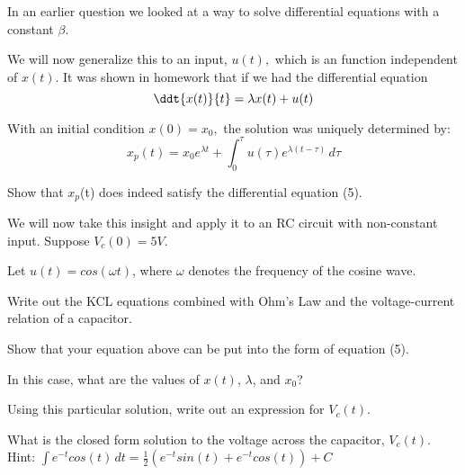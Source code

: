 
In an earlier question we looked at a way to solve differential equations with a constant $\beta.$
\par

We will now generalize this to an input, $u(t),$ which is an function independent of $x(t)$.
It was shown in homework that if we had the differential equation
\begin{equation}
\ddt{x(t)}{t} = \lambda x(t) + u(t)
\end{equation}

With an initial condition $x(0) = x_0,$ the solution was uniquely determined by:
\begin{equation}
    x_{p}(t) = x_{0}e^{\lambda{}t} + \int_0^\tau{} \! u(\tau{})e^{\lambda{}(t - \tau{})} \, d\tau{}
\end{equation}

\begin{enumerate}

\qitem Show that $x_{p}$(t) does indeed satisfy the differential equation (5).

\end{enumerate}

We will now take this insight and apply it to an RC circuit with non-constant input. Suppose $V_{c}(0) = 5V$.

\begin{figure}[H]
 
\end{figure}
Let $u(t) = cos(\omega{}t)$, where $\omega{}$ denotes the frequency of the cosine wave.

\begin{enumerate}[resume]

\qitem Write out the KCL equations combined with Ohm's Law and the voltage-current relation of a capacitor.

\sol{

}

\qitem Show that your equation above can be put into the form of equation (5).

\sol{

}

\qitem In this case, what are the values of $x(t)$, $\lambda{}$, and $x_{0}$?

\sol{

}

\qitem Using this particular solution, write out an expression for $V_{c}(t)$.

\sol{

}

\qitem What is the closed form solution to the voltage across the capacitor, $V_{c}(t)$.\\
Hint: $\int \! e^{-t}cos(t) \, dt = \frac{1}{2}(e^{-t}sin(t) + e^{-t}cos(t)) + C$

\sol{

}

\end{enumerate}
